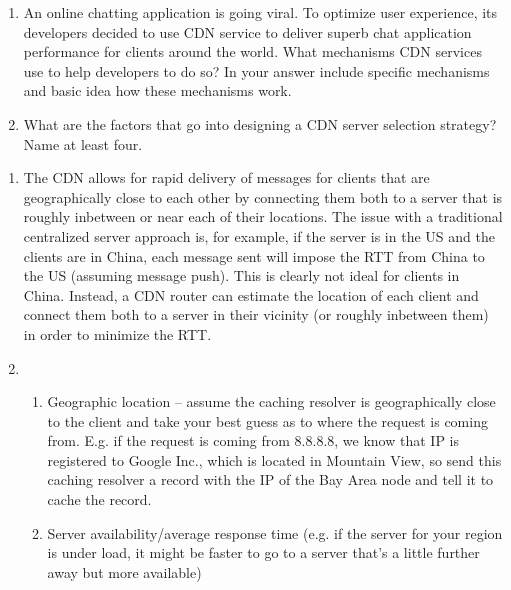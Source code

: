 \documentclass{report}
\begin{document}
\clearpage
\begin{problem}

  \begin{enumerate}
  \item An online chatting application is going viral.
        To optimize user experience, its developers decided to use CDN service
        to deliver superb chat application performance for clients around the
        world. What mechanisms CDN services use to help developers to do so?
        In your answer include specific mechanisms and basic idea how these
        mechanisms work.

  \item What are the factors that go into designing a CDN server selection
        strategy? Name at least four.
  \end{enumerate}

\begin{answer}{24em}
  \begin{enumerate}
  \item The CDN allows for rapid delivery of messages for clients that are
        geographically close to each other by connecting them both to a server
        that is roughly inbetween or near each of their locations. The issue
        with a traditional centralized server approach is, for example, if the
        server is in the US and the clients are in China, each message sent
        will impose the RTT from China to the US (assuming message push). This
        is clearly not ideal for clients in China. Instead, a CDN router can
        estimate the location of each client and connect them both to a server
        in their vicinity (or roughly inbetween them) in order to minimize the RTT.
  \item
    \begin{enumerate}
    \item Geographic location -- assume the caching resolver is geographically
          close to the client and take your best guess as to where the request
          is coming from. E.g. if the request is coming from 8.8.8.8, we know
          that IP is registered to Google Inc., which is located in Mountain
          View, so send this caching resolver a record with the IP of the Bay
          Area node and tell it to cache the record.

    \item Server availability/average response time (e.g. if the server for
          your region is under load, it might be faster to go to a server
          that's a little further away but more available)


\end{enumerate}
\end{enumerate}
\end{answer}
\end{problem}
\end{document}
